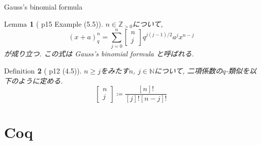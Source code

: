 \documentclass[dvipdfmx,cjk]{beamer}
\theoremstyle{mystyle}
\newtheorem{df}{$\textrm{Definition}$}[section]
\newtheorem{lem}[df]{$\textrm{Lemma}$}
\newcommand{\bpf}{\begin{proof}}
\newcommand{\epf}{\end{proof}}
\newcommand{\N}{\mathbb{N}}
\newcommand{\Z}{\mathbb{Z}}
\newcommand{\qcoe}[2]{\left[\begin{array}{ccc}#1\\#2\end{array}\right]}
\newcommand{\0}{\textbf{0}}
\begin{document}
\begin{frame}{Gauss's binomial formula}
	\begin{lem}[\cite{Kac} p15 Example (5.5)]
	  $n \in \Z_{>0}$について, 
	  \[
	    (x + a)^n_q = \sum_{j = 0}^n \qcoe{n}{j} q^{j (j - 1)/2} a^j x^{n - j}
	  \]
	  が成り立つ. この式は Gauss's binomial formula と呼ばれる. 
	\end{lem} \pause
	\begin{df}[\cite{Kac} p12 (4.5)]
		$n \ge j$をみたす$n$, $j \in \N$について, 二項係数の$q$-類似を以下のように定める. 
		\[
			\qcoe{n}{j} \coloneqq \frac{[n]!}{[j]![n - j]!}
		\]
	\end{df}
\end{frame}
\section{Coq}

\begin{frame}
  \tableofcontents[currentsection] 
\end{frame}

\end{document}
